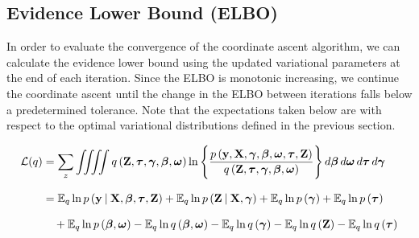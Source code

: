 \documentclass[twoside,11pt]{article}
\newcommand\given[1][]{\:#1\vert\:}
\newcommand{\boldbeta}{\boldsymbol\beta}
\newcommand{\boldgamma}{\boldsymbol\gamma}
\newcommand{\boldomega}{\boldsymbol\omega}
\newcommand{\boldtau}{\boldsymbol\tau}
\newcommand{\E}{\mathbb{E}}
\begin{document}
\newpage

\subsection{Evidence Lower Bound (ELBO)}
In order to evaluate the convergence of the coordinate ascent algorithm, we can calculate the evidence lower bound using the updated variational parameters at the end of each iteration. Since the ELBO is monotonic increasing, we continue the coordinate ascent until the change in the ELBO between iterations falls below a predetermined tolerance. Note that the expectations taken below are with respect to the optimal variational distributions defined in the previous section.

\begin{equation} \label{eq:ELBO}
\setlength{\jot}{11pt}
\begin{split}
	\mathcal{L}(q) &= \sum_{z} \iiiint q\left(\mathbf{Z}, \boldtau, \boldsymbol \gamma, \boldbeta, \boldsymbol \omega\right)
	\ln \Bigg\{ \frac{p\left(\mathbf{y}, \mathbf{X}, \boldsymbol \gamma, \boldbeta, \boldsymbol\omega, \boldtau, \mathbf{Z}\right)}{q \left(\mathbf{Z}, \boldtau, \boldsymbol \gamma,\boldbeta, \boldsymbol \omega \right)}\Bigg\}\, d\boldbeta\, d\boldsymbol\omega\, d\boldtau\, d\boldgamma \\
	&= \E_q \ln p\left( \mathbf{y} \given \mathbf{X}, \boldbeta, \boldtau, \mathbf{Z} \right) + \E_q \ln p\left( \mathbf{Z} \given \mathbf{X}, \boldgamma \right) + \E_q \ln p\left( \boldgamma \right) + \E_q \ln p\left( \boldtau \right) \\ & \quad + \E_q \ln p\left( \boldbeta, \boldomega \right) - \E_q \ln q\left( \boldbeta, \boldomega \right) - 
	\E_q \ln q\left( \boldgamma \right) - \E_q \ln q\left( \mathbf{Z} \right) - \E_q \ln q\left( \boldtau \right)
\end{split}
\end{equation}
\end{document}
